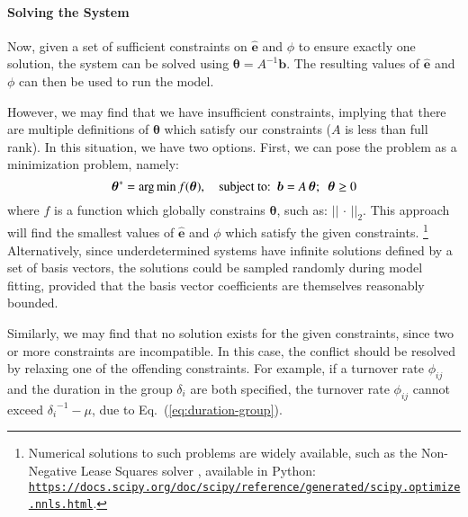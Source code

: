 \paragraph{Solving the System}
Now, given a set of sufficient constraints on $\bm{\hat{e}}$ and $\phi$
to ensure exactly one solution, the system can be solved using
$\bm{\theta} = A^{-1}\bm{b}$.
The resulting values of $\bm{\hat{e}}$ and $\phi$ can then be used to run the model.
\par
However, we may find that we have insufficient constraints, implying that
there are multiple definitions of $\bm{\theta}$ which satisfy our constraints
($A$ is less than full rank).
In this situation, we have two options.
First, we can pose the problem as a minimization problem, namely:
\begin{equation}\label{eq:system-optimize}
\bm{\theta}^{*} = {\arg \min}
\thinspace f(\bm{\theta}),
\quad \textrm{subject to:}
\enspace\bm{b} = A\thinspace\bm{\theta};
\enspace\bm{\theta} \ge 0
\end{equation}
where $f$ is a function which globally constrains $\bm{\theta}$,
such as: ${\left|\left| \,\cdot\, \right|\right|}_2$.
This approach will find the smallest values of $\bm{\hat{e}}$ and $\phi$
which satisfy the given constraints.%
\footnote{Numerical solutions to such problems are widely available,
  such as the Non-Negative Lease Squares solver \citep{Lawson1995},
  available in Python:
   \href{https://docs.scipy.org/doc/scipy/reference/generated/scipy.optimize.nnls.html}
{\texttt{https://docs.scipy.org/doc/scipy/reference/generated/scipy.optimize.nnls.html}}.}
Alternatively, since underdetermined systems have infinite solutions
defined by a set of basis vectors, the solutions could be sampled
randomly during model fitting,
provided that the basis vector coefficients are themselves reasonably bounded.
\par
Similarly, we may find that no solution exists for the given constraints,
since two or more constraints are incompatible.
In this case, the conflict should be resolved by
relaxing one of the offending constraints.
For example, if
a turnover rate $\phi_{ij}$ and the duration in the group $\delta_i$ are both specified,
the turnover rate $\phi_{ij}$ cannot exceed ${\delta_i}^{-1} - \mu$,
due to Eq.~(\ref{eq:duration-group}).
